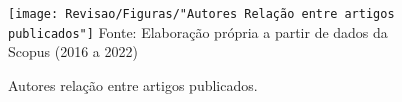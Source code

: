 \begin{figure}[H]
	\centering
	\caption{Autores relação entre artigos publicados.	}
	\label{fig:autores-relacao-entre-artigos-publicados}
	\texttt{[image: Revisao/Figuras/"Autores Relação entre artigos publicados"]}
	\vspace{0.2cm}
	Fonte: Elaboração própria a partir de dados da Scopus (2016 a 2022)
\end{figure}